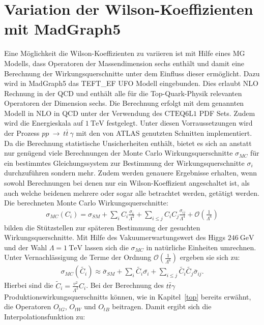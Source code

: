 \section{Variation der Wilson-Koeffizienten mit MadGraph5}
Eine Möglichkeit die Wilson-Koeffizienten zu variieren ist mit Hilfe eines MG Modells, dass Operatoren der Massendimension sechs enthält und damit eine Berechnung der Wirkungsquerschnitte unter dem Einfluss dieser ermöglicht. Dazu wird in MadGraph5 das TEFT\_EF UFO Modell\cite{EFTModell} eingebunden. Dies erlaubt NLO Rechnung in der QCD und enthält alle für die Top-Quark-Physik relevanten Operatoren der Dimension sechs.
Die Berechnung erfolgt mit dem genannten Modell in NLO in QCD unter der Verwendung des $\text{CTEQ}6\text{L}1$ PDF Sets. Zudem wird die Energieskala auf $\SI{1}{\tera\electronvolt}$ festgelegt. Unter diesen Vorraussetzungen wird der Prozess $pp~\rightarrow~t\bar{t}~\gamma$ mit den von ATLAS genutzten Schnitten implementiert.\\
Da die Berechnung statistische Unsicherheiten enthält, bietet es sich an anstatt nur genügend viele Berechnungen der Monte Carlo Wirkungsquerschnitte $\sigma_{MC}$ für ein bestimmtes Gleichungssystem zur Bestimmung der Wirkungsquerschnitte $\sigma_i$ durchzuführen sondern mehr. Zudem werden genauere Ergebnisse erhalten, wenn sowohl Berechnungen bei denen nur ein Wilson-Koeffizient angeschaltet ist, als auch welche beidenen mehrere oder sogar alle betrachtet werden, getätigt werden.\\
Die berechneten Monte Carlo Wirkungsquerschnitte:
\begin{align}
  \sigma_{MC}({C_i}) = \sigma_{SM} + \sum_{i} C_i \frac{\sigma_i}{\Lambda^2} + \sum_{i \leq j} C_i C_j \frac{\sigma_{ij}}{\Lambda^4} + \mathcal{O}(\frac{1}{\Lambda^6})
\end{align}
bilden die Stützstellen zur späteren Bestimmung der gesuchten Wirkungsquerschnitte. Mit Hilfe des Vakuumerwartungswert des Higgs $\SI{246}{\giga\electronvolt}$ und der Wahl $\Lambda = \SI{1}{\tera\electronvolt}$ lassen sich die $\sigma_{MC}$ in natürliche Einheiten umrechnen. Unter Vernachlässigung de Terme der Ordnung $\mathcal{O}(\frac{1}{\Lambda^6})$ ergeben sie sich zu:
\begin{align}
  \sigma_{MC}({\tilde{C_i}}) \approx \bar{\sigma}_{SM} + \sum_{i} \tilde{C_i} \bar{\sigma_i} + \sum_{i \leq j} \tilde{C_i} \tilde{C_j} \bar{\sigma}_{ij}.
\end{align}
Hierbei sind die $\tilde{C}_i = \frac{v^2}{\Lambda^2} C_i$.
Bei der Berechnung des $t\bar{t}\gamma$ Produktionswirkungsquerschnitts können, wie in Kapitel~\ref{top} bereits erwähnt, die Operatoren $O_{tG}$, $O_{tW}$ und $O_{tB}$ beitragen. Damit ergibt sich die Interpolationsfunktion zu:
